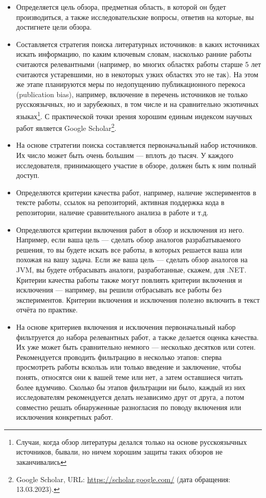 \documentclass{article}
\begin{document}
\begin{itemize}
    \item Определяется цель обзора, предметная область, в которой он будет производиться, а также исследовательские вопросы, ответив на которые, вы достигнете цели обзора.
    \item Составляется стратегия поиска литературных источников: в каких источниках искать информацию, по каким ключевым словам, насколько ранние работы считаются релевантными (например, во многих областях работы старше 5 лет считаются устаревшими, но в некоторых узких областях это не так). На этом же этапе планируются меры по недопущению публикационного перекоса (publication bias), например, включение в перечень источников не только русскоязычных, но и зарубежных, в том числе и на сравнительно экзотичных языках\footnote{Случаи, когда обзор литературы делался только на основе русскоязычных источников, бывали, но ничем хорошим защиты таких обзоров не заканчивались}. С практической точки зрения хорошим единым индексом научных работ является Google Scholar\footnote{Google Scholar, URL: \url{https://scholar.google.com/} (дата обращения: 13.03.2023).}. 
    \item На основе стратегии поиска составляется первоначальный набор источников. Их число может быть очень большим --- вплоть до тысяч. У каждого исследователя, принимающего участие в обзоре, должен быть к ним полный доступ.
    \item Определяются критерии качества работ, например, наличие экспериментов в тексте работы, ссылок на репозиторий, активная поддержка кода в репозитории, наличие сравнительного анализа в работе и т.д.
    \item Определяются критерии включения работ в обзор и исключения из него. Например, если ваша цель --- сделать обзор аналогов разрабатываемого решения, то вы будете искать все работы, в которых решается ваша или похожая на вашу задача. Если же ваша цель --- сделать обзор аналогов на JVM, вы будете отбрасывать аналоги, разработанные, скажем, для .NET. Критерии качества работы также могут повлиять критерии включения и исключения --- например, вы решили отбрасывать все работы без экспериментов. Критерии включения и исключения полезно включить в текст отчёта по практике.
    \item На основе критериев включения и исключения первоначальный набор фильтруется до набора релевантных работ, а также делается оценка качества. Их уже может быть сравнительно немного --- несколько десятков или сотен. Рекомендуется проводить фильтрацию в несколько этапов: сперва просмотреть работы вскользь или только введение и заключение, чтобы понять, относятся они к вашей теме или нет, а затем оставшиеся читать более вдумчиво. Сколько бы этапов фильтрации ни было, каждый из них исследователям рекомендуется делать независимо друг от друга, а потом совместно решать обнаруженные разногласия по поводу включения или исключения конкретных работ.

\end{itemize}
\end{document}
